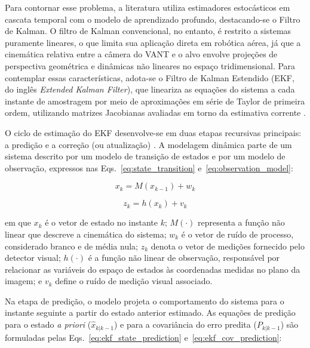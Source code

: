 Para contornar esse problema, a literatura utiliza estimadores estocásticos em cascata temporal com o modelo de aprendizado profundo, destacando-se o Filtro de Kalman. O filtro de Kalman convencional, no entanto, é restrito a sistemas puramente lineares, o que limita sua aplicação direta em robótica aérea, já que a cinemática relativa entre a câmera do VANT e o alvo envolve projeções de perspectiva geométrica e dinâmicas não lineares no espaço tridimensional. Para contemplar essas características, adota-se o Filtro de Kalman Estendido (EKF, do inglês \textit{Extended Kalman Filter}), que lineariza as equações do sistema a cada instante de amostragem por meio de aproximações em série de Taylor de primeira ordem, utilizando matrizes Jacobianas avaliadas em torno da estimativa corrente \cite{tcc_mariahelena, kalman_beginners, kordic2010}.

O ciclo de estimação do EKF desenvolve-se em duas etapas recursivas principais: a predição e a correção (ou atualização) \cite{kalman_beginners, tcc_mariahelena}. A modelagem dinâmica parte de um sistema descrito por um modelo de transição de estados e por um modelo de observação, expressos nas Eqs.~\ref{eq:state_transition} e~\ref{eq:observation_model}:

\begin{equation}
x_k = M(x_{k-1}) + w_k
\label{eq:state_transition}
\end{equation}

\begin{equation}
z_k = h(x_k) + v_k
\label{eq:observation_model}
\end{equation}

\noindent em que $x_k$ é o vetor de estado no instante $k$; $M(\cdot)$ representa a função não linear que descreve a cinemática do sistema; $w_k$ é o vetor de ruído de processo, considerado branco e de média nula; $z_k$ denota o vetor de medições fornecido pelo detector visual; $h(\cdot)$ é a função não linear de observação, responsável por relacionar as variáveis do espaço de estados às coordenadas medidas no plano da imagem; e $v_k$ define o ruído de medição visual associado.

Na etapa de predição, o modelo projeta o comportamento do sistema para o instante seguinte a partir do estado anterior estimado. As equações de predição para o estado \textit{a priori} ($\hat{x}_{k|k-1}$) e para a covariância do erro predita ($P_{k|k-1}$) são formuladas pelas Eqs.~\ref{eq:ekf_state_prediction} e~\ref{eq:ekf_cov_prediction}:

